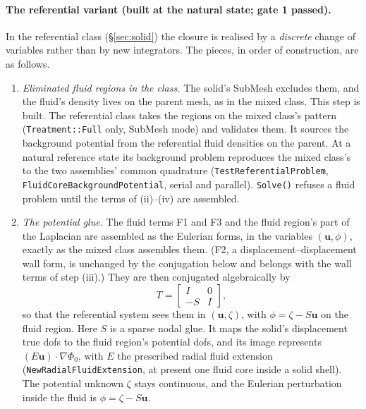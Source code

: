 \documentclass[11pt]{article}
\theoremstyle{definition}
\theoremstyle{remark}
\newcommand{\bu}{\mathbf{u}}
\newcommand{\code}[1]{\texttt{#1}}
\begin{document}
\paragraph{The referential variant (built at the natural state;
gate 1 passed).} In the referential class
(\S\ref{sec:solid}) the closure is realised by a \emph{discrete} change
of variables rather than by new integrators. The pieces, in order of
construction, are as follows.
\begin{enumerate}
\item[(i)] \emph{Eliminated fluid regions in the class.} The solid's
  SubMesh excludes them, and the fluid's density lives on the parent
  mesh, as in the mixed class. This step is built. The referential
  class takes the regions on the mixed class's pattern
  (\code{Treatment::Full} only, SubMesh mode) and validates them. It
  sources the background potential from the referential fluid
  densities on the parent. At a natural reference state its
  background problem reproduces the mixed class's to the two
  assemblies' common quadrature (\code{TestReferentialProblem},
  \code{FluidCoreBackgroundPotential}, serial and parallel).
  \code{Solve()} refuses a fluid problem until the terms of
  (ii)--(iv) are assembled.
\item[(ii)] \emph{The potential glue.} The fluid terms F1 and F3 and
  the fluid region's part of the Laplacian are assembled as the
  Eulerian forms, in the variables $(\bu, \phi)$, exactly as the mixed
  class assembles them. (F2, a displacement--displacement wall form,
  is unchanged by the conjugation below and belongs with the wall terms
  of step (iii).) They are then conjugated algebraically by
  \begin{equation*}
    T = \begin{bmatrix} I & 0\\ -S & I\end{bmatrix},
  \end{equation*}
  so that the referential system sees them in $(\bu, \zeta)$, with
  $\phi = \zeta - S\bu$ on the fluid region. Here $S$ is a sparse
  nodal glue. It maps the solid's displacement true dofs to the fluid
  region's potential dofs, and its image represents
  $(E\bu)\cdot\nabla\Phi_0$, with $E$ the prescribed radial fluid
  extension (\code{NewRadialFluidExtension}, at present one fluid core
  inside a solid shell). The potential unknown $\zeta$ stays
  continuous, and the Eulerian perturbation inside the fluid is $\phi
  = \zeta - S\bu$.


\end{enumerate}
\end{document}
